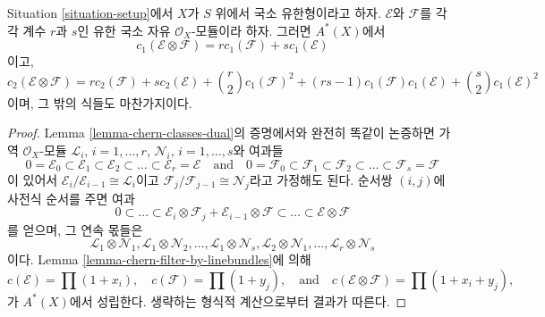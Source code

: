 \begin{lemma}
\label{lemma-chern-classes-tensor-product}
Situation \ref{situation-setup}에서 $X$가 $S$ 위에서 국소 유한형이라고
하자. $\mathcal{E}$와 $\mathcal{F}$를 각각 계수 $r$과 $s$인 유한
국소 자유 $\mathcal{O}_X$-모듈이라 하자. 그러면 $A^*(X)$에서
$$
c_1(\mathcal{E} \otimes \mathcal{F})
=
r c_1(\mathcal{F}) + s c_1(\mathcal{E})
$$
이고,
$$
c_2(\mathcal{E} \otimes \mathcal{F})
=
r c_2(\mathcal{F}) + s c_2(\mathcal{E}) +
{r \choose 2} c_1(\mathcal{F})^2 +
(rs - 1) c_1(\mathcal{F})c_1(\mathcal{E}) +
{s \choose 2} c_1(\mathcal{E})^2
$$
이며, 그 밖의 식들도 마찬가지이다.
\end{lemma}

\begin{proof}
Lemma \ref{lemma-chern-classes-dual}의 증명에서와 완전히 똑같이 논증하면
가역 $\mathcal{O}_X$-모듈
${\mathcal L}_i$, $i = 1, \ldots, r$,
${\mathcal N}_i$, $i = 1, \ldots, s$와 여과들
$$
0 = \mathcal{E}_0 \subset \mathcal{E}_1 \subset \mathcal{E}_2
\subset \ldots \subset \mathcal{E}_r = \mathcal{E}
\quad\text{and}\quad
0 = \mathcal{F}_0 \subset \mathcal{F}_1 \subset \mathcal{F}_2
\subset \ldots \subset \mathcal{F}_s = \mathcal{F}
$$
이 있어서 $\mathcal{E}_i/\mathcal{E}_{i - 1} \cong \mathcal{L}_i$이고
$\mathcal{F}_j/\mathcal{F}_{j - 1} \cong \mathcal{N}_j$라고
가정해도 된다. 순서쌍 $(i, j)$에 사전식 순서를 주면 여과
$$
0 \subset \ldots \subset
\mathcal{E}_i \otimes \mathcal{F}_j
+
\mathcal{E}_{i - 1} \otimes \mathcal{F}
\subset \ldots \subset \mathcal{E} \otimes \mathcal{F}
$$
를 얻으며, 그 연속 몫들은
$$
\mathcal{L}_1 \otimes \mathcal{N}_1,
\mathcal{L}_1 \otimes \mathcal{N}_2,
\ldots,
\mathcal{L}_1 \otimes \mathcal{N}_s,
\mathcal{L}_2 \otimes \mathcal{N}_1,
\ldots,
\mathcal{L}_r \otimes \mathcal{N}_s
$$
이다. Lemma \ref{lemma-chern-filter-by-linebundles}에 의해
$$
c(\mathcal{E}) = \prod (1 + x_i),
\quad
c(\mathcal{F}) = \prod (1 + y_j),
\quad\text{and}\quad
c(\mathcal{E} \otimes \mathcal{F}) = \prod (1 + x_i + y_j),
$$
가 $A^*(X)$에서 성립한다. 생략하는 형식적 계산으로부터 결과가 따른다.
\end{proof}

